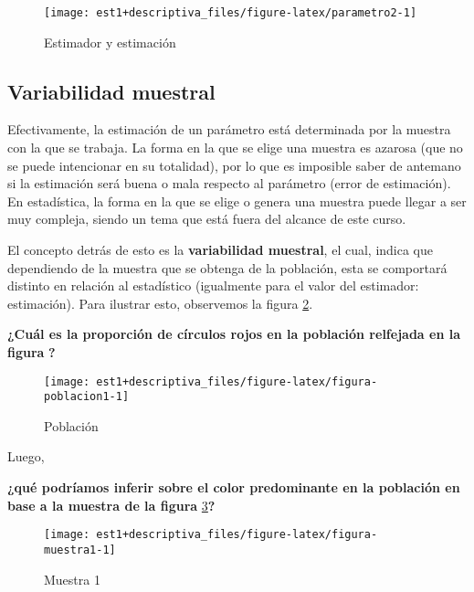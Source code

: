 \documentclass[
]{book}
\begin{document}
\begin{figure}

{\centering \texttt{[image: est1+descriptiva\_files/figure-latex/parametro2-1]} 

}

\caption{Estimador y estimación}\label{fig:parametro2}
\end{figure}

\hypertarget{variabilidad-muestral}{%
\subsection{Variabilidad muestral}\label{variabilidad-muestral}}

Efectivamente, la estimación de un parámetro está determinada por la muestra con la que se trabaja. La forma en la que se elige una muestra es azarosa (que no se puede intencionar en su totalidad), por lo que es imposible saber de antemano si la estimación será buena o mala respecto al parámetro (error de estimación). En estadística, la forma en la que se elige o genera una muestra puede llegar a ser muy compleja, siendo un tema que está fuera del alcance de este curso.

El concepto detrás de esto es la \textbf{variabilidad muestral}, el cual, indica que dependiendo de la muestra que se obtenga de la población, esta se comportará distinto en relación al estadístico (igualmente para el valor del estimador: estimación). Para ilustrar esto, observemos la figura \ref{fig:figura-poblacion1}.

\textbf{¿Cuál es la proporción de círculos rojos en la población relfejada en la figura} \textbf{?}

\begin{figure}

{\centering \texttt{[image: est1+descriptiva\_files/figure-latex/figura-poblacion1-1]} 

}

\caption{Población}\label{fig:figura-poblacion1}
\end{figure}

Luego,

\textbf{¿qué podríamos inferir sobre el color predominante en la población en base a la muestra de la figura} \ref{fig:figura-muestra1}\textbf{?}

\begin{figure}

{\centering \texttt{[image: est1+descriptiva\_files/figure-latex/figura-muestra1-1]} 

}

\caption{Muestra 1}\label{fig:figura-muestra1}
\end{figure}
\end{document}
